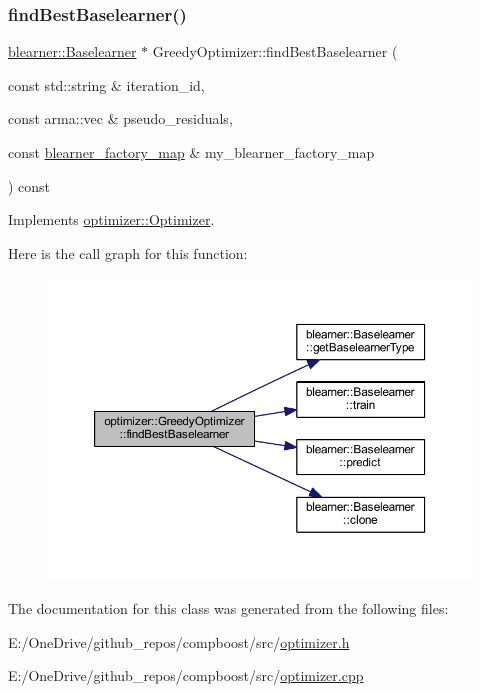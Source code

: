 \subsubsection{\texorpdfstring{find\+Best\+Baselearner()}{findBestBaselearner()}}
{\footnotesize\ttfamily \mbox{\hyperlink{classblearner_1_1_baselearner}{blearner\+::\+Baselearner}} $\ast$ Greedy\+Optimizer\+::find\+Best\+Baselearner (\begin{DoxyParamCaption}\item[{const std\+::string \&}]{iteration\+\_\+id,  }\item[{const arma\+::vec \&}]{pseudo\+\_\+residuals,  }\item[{const \mbox{\hyperlink{baselearner__factory__list_8h_a058570e00ae11b882cfed36eb40be025}{blearner\+\_\+factory\+\_\+map}} \&}]{my\+\_\+blearner\+\_\+factory\+\_\+map }\end{DoxyParamCaption}) const\hspace{0.3cm}{\ttfamily [virtual]}}



Implements \mbox{\hyperlink{classoptimizer_1_1_optimizer_a134c7b34ed868231fbab53e9ebfa8fd8}{optimizer\+::\+Optimizer}}.

Here is the call graph for this function\+:\nopagebreak
\begin{figure}[H]
\begin{center}
\leavevmode
\includegraphics[width=350pt]{classoptimizer_1_1_greedy_optimizer_a5551f9dd7135e3a4acc68ac585be3146_cgraph}
\end{center}
\end{figure}


The documentation for this class was generated from the following files\+:\begin{DoxyCompactItemize}
\item 
E\+:/\+One\+Drive/github\+\_\+repos/compboost/src/\mbox{\hyperlink{optimizer_8h}{optimizer.\+h}}\item 
E\+:/\+One\+Drive/github\+\_\+repos/compboost/src/\mbox{\hyperlink{optimizer_8cpp}{optimizer.\+cpp}}\end{DoxyCompactItemize}
